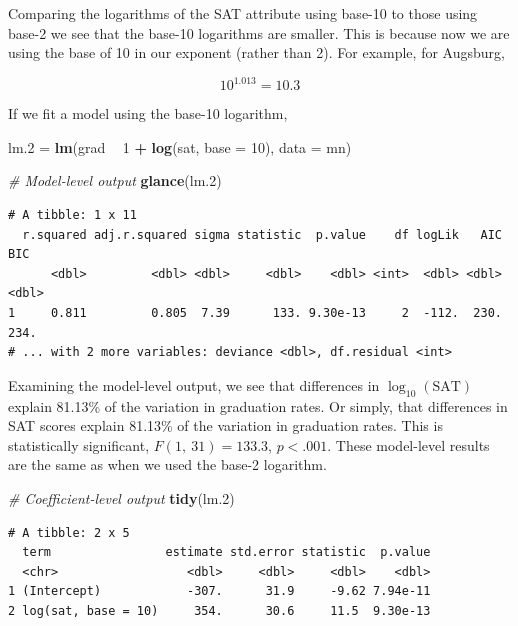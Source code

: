 \documentclass[]{book}
\newenvironment{Shaded}{\begin{snugshade}}{\end{snugshade}}
\newcommand{\CommentTok}[1]{\textcolor[rgb]{0.56,0.35,0.01}{\textit{#1}}}
\newcommand{\DataTypeTok}[1]{\textcolor[rgb]{0.13,0.29,0.53}{#1}}
\newcommand{\DecValTok}[1]{\textcolor[rgb]{0.00,0.00,0.81}{#1}}
\newcommand{\FloatTok}[1]{\textcolor[rgb]{0.00,0.00,0.81}{#1}}
\newcommand{\KeywordTok}[1]{\textcolor[rgb]{0.13,0.29,0.53}{\textbf{#1}}}
\newcommand{\NormalTok}[1]{#1}
\newcommand{\OperatorTok}[1]{\textcolor[rgb]{0.81,0.36,0.00}{\textbf{#1}}}
\newcommand{\StringTok}[1]{\textcolor[rgb]{0.31,0.60,0.02}{#1}}
\begin{document}
Comparing the logarithms of the SAT attribute using base-10 to those using base-2 we see that the base-10 logarithms are smaller. This is because now we are using the base of 10 in our exponent (rather than 2). For example, for Augsburg,

\[
10^{1.013} = 10.3
\]

If we fit a model using the base-10 logarithm,

\begin{Shaded}
\begin{Highlighting}[]
\NormalTok{lm}\FloatTok{.2}\NormalTok{ =}\StringTok{ }\KeywordTok{lm}\NormalTok{(grad }\OperatorTok{~}\StringTok{ }\DecValTok{1} \OperatorTok{+}\StringTok{ }\KeywordTok{log}\NormalTok{(sat, }\DataTypeTok{base =} \DecValTok{10}\NormalTok{), }\DataTypeTok{data =}\NormalTok{ mn)}

\CommentTok{# Model-level output}
\KeywordTok{glance}\NormalTok{(lm}\FloatTok{.2}\NormalTok{)}
\end{Highlighting}
\end{Shaded}

\begin{verbatim}
# A tibble: 1 x 11
  r.squared adj.r.squared sigma statistic  p.value    df logLik   AIC   BIC
      <dbl>         <dbl> <dbl>     <dbl>    <dbl> <int>  <dbl> <dbl> <dbl>
1     0.811         0.805  7.39      133. 9.30e-13     2  -112.  230.  234.
# ... with 2 more variables: deviance <dbl>, df.residual <int>
\end{verbatim}

Examining the model-level output, we see that differences in \(\log_{10}(\mathrm{SAT})\) explain 81.13\% of the variation in graduation rates. Or simply, that differences in SAT scores explain 81.13\% of the variation in graduation rates. This is statistically significant, \(F(1,~31)=133.3\), \(p<.001\). These model-level results are the same as when we used the base-2 logarithm.

\begin{Shaded}
\begin{Highlighting}[]
\CommentTok{# Coefficient-level output}
\KeywordTok{tidy}\NormalTok{(lm}\FloatTok{.2}\NormalTok{)}
\end{Highlighting}
\end{Shaded}

\begin{verbatim}
# A tibble: 2 x 5
  term                estimate std.error statistic  p.value
  <chr>                  <dbl>     <dbl>     <dbl>    <dbl>
1 (Intercept)            -307.      31.9     -9.62 7.94e-11
2 log(sat, base = 10)     354.      30.6     11.5  9.30e-13
\end{verbatim}
\end{document}
